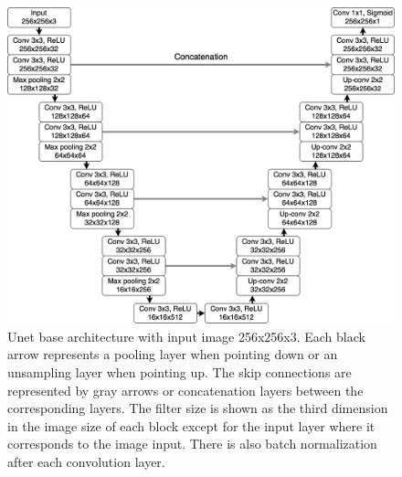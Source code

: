 \begin{figure}[tbh]
\centering
\includegraphics[width=\textwidth]{Unet_Architecture.png}
\caption{Unet base architecture with input image 256x256x3. Each black arrow represents a pooling layer when pointing down or an unsampling layer when pointing up. The skip connections are represented by gray arrows or concatenation layers between the corresponding layers. The filter size is shown as the third dimension in the image size of each block except for the input layer where it corresponds to the image input. There is also batch normalization after each convolution layer.}
\label{fig_Unet}
\end{figure}


